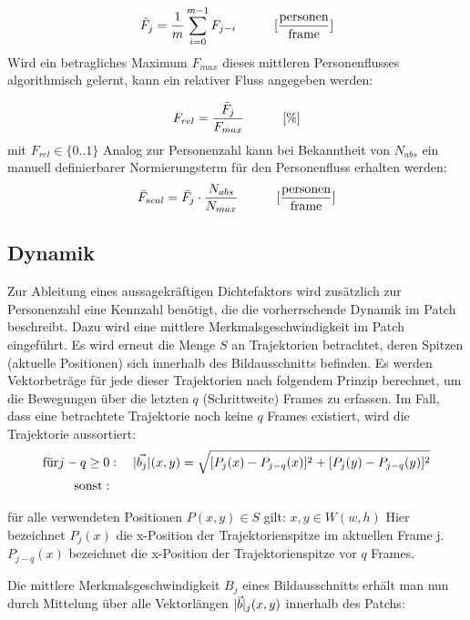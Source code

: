 \begin{equation}
\bar{F}_j = \frac{1}{m}\sum_{i=0}^{m-1}F_{j-i} \hskip 30pt [\frac{\text{personen}}{\text{frame}}]
\end{equation}
\vskip 10pt
Wird ein betragliches Maximum $F_{max}$ dieses mittleren Personenflusses algorithmisch gelernt, kann ein relativer Fluss angegeben werden:

\begin{equation}
F_{rel} = \frac{\bar{F}_j}{F_{max}} \hskip 30pt [\%]
\end{equation}
mit $F_{rel}\in \{0..1\}$
\vskip 10pt
Analog zur Personenzahl kann bei Bekanntheit von $N_{abs}$ ein manuell definierbarer Normierungsterm für den Personenfluss erhalten werden:
\vskip 5pt
\begin{equation}
    \bar{F}_{scal} = \bar{F}_j \cdot \frac{N_{abs}}{N_{max}} \hskip 30pt [\frac{\text{personen}}{\text{frame}}]
\end{equation}

\newpage
\subsection{Dynamik}
Zur Ableitung eines aussagekräftigen Dichtefaktors wird zusätzlich zur Personenzahl eine Kennzahl benötigt, die die vorherrschende Dynamik im Patch beschreibt. Dazu wird eine mittlere Merkmalsgeschwindigkeit im Patch eingeführt. Es wird erneut die Menge $S$ an Trajektorien betrachtet, deren Spitzen (aktuelle Positionen) sich innerhalb des Bildausschnitts befinden. Es werden Vektorbeträge für jede dieser Trajektorien nach folgendem Prinzip berechnet, um die Bewegungen über die letzten $q$ (Schrittweite) Frames zu erfassen. Im Fall, dass eine betrachtete Trajektorie noch keine $q$ Frames existiert, wird die Trajektorie aussortiert:
\begin{align}
\text{für} j-q \geq 0&: \hskip 10pt \lvert\vec{b_j}\rvert(x,y) = \sqrt{[P_{j}(x) - P_{j-q}(x)]^2 + [P_{j}(y) - P_{j-q}(y)]^2} \notag \\
\text{sonst}:
\end{align}
\begin{flushleft}
für alle verwendeten Positionen $P(x,y)\in S$ gilt: $x,y\in W(w,h)$\vskip 5pt
Hier bezeichnet $P_j(x)$ die x-Position der Trajektorienspitze im aktuellen Frame j. $P_{j-q}(x)$ bezeichnet die x-Position der Trajektorienspitze vor $q$ Frames.
\end{flushleft} \vskip 5pt
Die mittlere Merkmalsgeschwindigkeit $B_j$ eines Bildausschnitts erhält man nun durch Mittelung über alle Vektorlängen $\lvert\vec{b}\rvert_j(x,y)$ innerhalb des Patchs:

